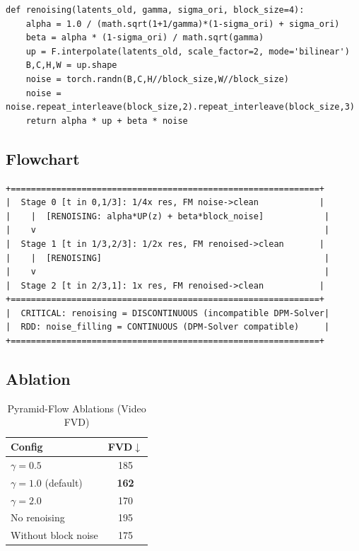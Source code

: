 \documentclass[11pt, a4paper]{article}
\begin{document}
\begin{lstlisting}[caption={Pyramid-Flow: Renoising Step}]
def renoising(latents_old, gamma, sigma_ori, block_size=4):
    alpha = 1.0 / (math.sqrt(1+1/gamma)*(1-sigma_ori) + sigma_ori)
    beta = alpha * (1-sigma_ori) / math.sqrt(gamma)
    up = F.interpolate(latents_old, scale_factor=2, mode='bilinear')
    B,C,H,W = up.shape
    noise = torch.randn(B,C,H//block_size,W//block_size)
    noise = noise.repeat_interleave(block_size,2).repeat_interleave(block_size,3)
    return alpha * up + beta * noise
\end{lstlisting}

\subsection{Flowchart}

\begin{lstlisting}[style=flowchart, caption={Pyramid-Flow Video Pipeline}]
+=============================================================+
|  Stage 0 [t in 0,1/3]: 1/4x res, FM noise->clean            |
|    |  [RENOISING: alpha*UP(z) + beta*block_noise]            |
|    v                                                         |
|  Stage 1 [t in 1/3,2/3]: 1/2x res, FM renoised->clean       |
|    |  [RENOISING]                                            |
|    v                                                         |
|  Stage 2 [t in 2/3,1]: 1x res, FM renoised->clean           |
+=============================================================+
|  CRITICAL: renoising = DISCONTINUOUS (incompatible DPM-Solver|
|  RDD: noise_filling = CONTINUOUS (DPM-Solver compatible)     |
+=============================================================+
\end{lstlisting}

\subsection{Ablation}

\begin{table}[H]
\centering
\caption{Pyramid-Flow Ablations (Video FVD)}
\begin{tabular}{lc}
\toprule
Config & FVD$\downarrow$ \\
\midrule
$\gamma=0.5$ & 185 \\
$\gamma=1.0$ (default) & \textbf{162} \\
$\gamma=2.0$ & 170 \\
No renoising & 195 \\
Without block noise & 175 \\
\bottomrule
\end{tabular}
\end{table}
\end{document}
